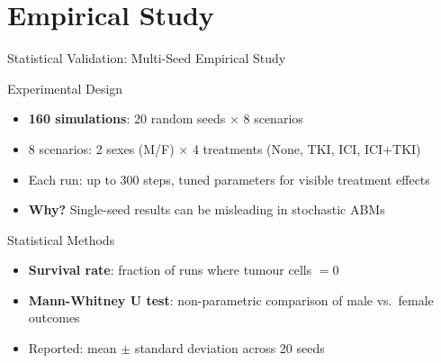 \documentclass[aspectratio=169,10pt]{beamer}
\begin{document}
\section{Empirical Study}

\begin{frame}{Statistical Validation: Multi-Seed Empirical Study}
  \begin{block}{Experimental Design}
    \begin{itemize}
      \item \textbf{160 simulations}: 20 random seeds $\times$ 8 scenarios
      \item 8 scenarios: 2 sexes (M/F) $\times$ 4 treatments (None, TKI, ICI, ICI+TKI)
      \item Each run: up to 300 steps, tuned parameters for visible treatment effects
      \item \textbf{Why?} Single-seed results can be misleading in stochastic ABMs
    \end{itemize}
  \end{block}

  \begin{block}{Statistical Methods}
    \begin{itemize}
      \item \textbf{Survival rate}: fraction of runs where tumour cells $= 0$
      \item \textbf{Mann-Whitney U test}: non-parametric comparison of male vs.\ female outcomes
      \item Reported: mean $\pm$ standard deviation across 20 seeds
    \end{itemize}
  \end{block}
\end{frame}
\end{document}

